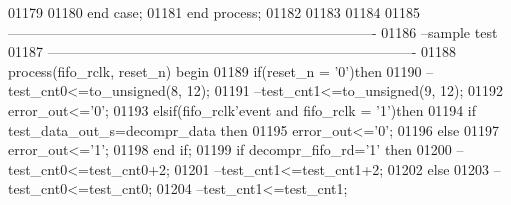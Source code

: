 \begin{DoxyCode}
01179         
01180       \textcolor{keywordflow}{end} \textcolor{keywordflow}{case};
01181 \textcolor{keywordflow}{end} \textcolor{keywordflow}{process};  
01182 
01183 
01184 
01185 \textcolor{keyword}{-------------------------------------------------------------------------------}
01186 \textcolor{keyword}{--sample test}
01187 \textcolor{keyword}{-------------------------------------------------------------------------------}
01188 \textcolor{keywordflow}{process}(fifo_rclk, reset_n) \textcolor{keywordflow}{begin}
01189     \textcolor{keywordflow}{if}\textcolor{vhdlchar}{(}\textcolor{vhdlchar}{reset_n} \textcolor{vhdlchar}{=} \textcolor{vhdlchar}{'}\textcolor{vhdllogic}{}\textcolor{vhdllogic}{0}\textcolor{vhdlchar}{'}\textcolor{vhdlchar}{)}\textcolor{keywordflow}{then}
01190 \textcolor{keyword}{        --test\_cnt0<=to\_unsigned(8, 12);}
01191 \textcolor{keyword}{        --test\_cnt1<=to\_unsigned(9, 12);}
01192         \textcolor{vhdlchar}{error_out}\textcolor{vhdlchar}{<=}\textcolor{vhdlchar}{'}\textcolor{vhdllogic}{}\textcolor{vhdllogic}{0}\textcolor{vhdlchar}{'};
01193     \textcolor{keywordflow}{elsif}\textcolor{vhdlchar}{(}\textcolor{vhdlchar}{fifo_rclk}\textcolor{vhdlchar}{'}\textcolor{vhdlkeyword}{event} \textcolor{keywordflow}{and} \textcolor{vhdlchar}{fifo_rclk} \textcolor{vhdlchar}{=} \textcolor{vhdlchar}{'}\textcolor{vhdllogic}{}\textcolor{vhdllogic}{1}\textcolor{vhdlchar}{'}\textcolor{vhdlchar}{)}\textcolor{keywordflow}{then}
01194      \textcolor{keywordflow}{if} \textcolor{vhdlchar}{test_data_out_s}\textcolor{vhdlchar}{=}\textcolor{vhdlchar}{decompr_data} \textcolor{keywordflow}{then} 
01195        \textcolor{vhdlchar}{error_out}\textcolor{vhdlchar}{<=}\textcolor{vhdlchar}{'}\textcolor{vhdllogic}{}\textcolor{vhdllogic}{0}\textcolor{vhdlchar}{'};
01196      \textcolor{keywordflow}{else} 
01197       \textcolor{vhdlchar}{error_out}\textcolor{vhdlchar}{<=}\textcolor{vhdlchar}{'}\textcolor{vhdllogic}{}\textcolor{vhdllogic}{1}\textcolor{vhdlchar}{'};
01198      \textcolor{keywordflow}{end} \textcolor{keywordflow}{if}; 
01199         \textcolor{keywordflow}{if} \textcolor{vhdlchar}{decompr_fifo_rd}\textcolor{vhdlchar}{=}\textcolor{vhdlchar}{'}\textcolor{vhdllogic}{}\textcolor{vhdllogic}{1}\textcolor{vhdlchar}{'} \textcolor{keywordflow}{then} 
01200 \textcolor{keyword}{            --test\_cnt0<=test\_cnt0+2;}
01201 \textcolor{keyword}{            --test\_cnt1<=test\_cnt1+2;}
01202             \textcolor{keywordflow}{else}
01203 \textcolor{keyword}{            --test\_cnt0<=test\_cnt0;}
01204 \textcolor{keyword}{            --test\_cnt1<=test\_cnt1; }

\end{DoxyCode}

